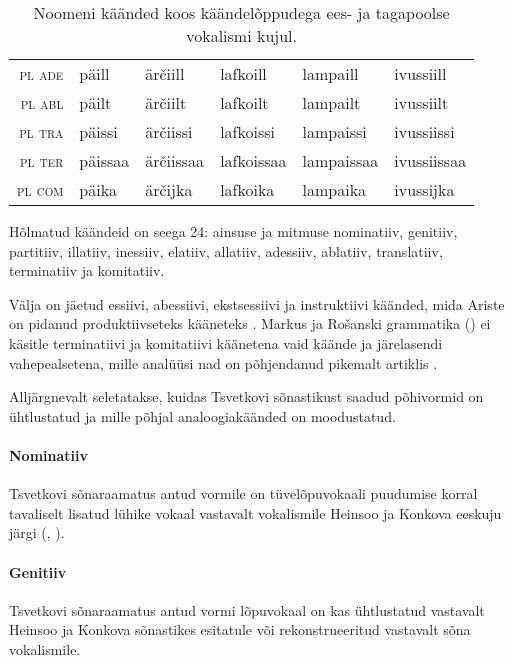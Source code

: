 \documentclass[12pt,a4paper]{article}
\newcommand{\msd}[1]{\textsc{#1}}
\begin{document}
\begin{table}[ht]
\begin{tabular}[t]{r l l l l l}
    \msd{pl ade} & päill & ärčiill & lafkoill & lampaill & ivussiill \\
    \msd{pl abl} & päilt & ärčiilt & lafkoilt & lampailt & ivussiilt \\
    \msd{pl tra} & päissi & ärčiissi & lafkoissi & lampaissi & ivussiissi \\
    \msd{pl ter} & päissaa & ärčiissaa & lafkoissaa & lampaissaa &  ivussiissaa \\
    \msd{pl com} & päika & ärčijka & lafkoika & lampaika & ivussijka \\
  \end{tabular}
  \caption{Noomeni käänded koos käändelõppudega ees- ja tagapoolse vokalismi kujul.}
  \label{tab:noomeni-käänded}
\end{table}

Hõlmatud käändeid on seega 24: ainsuse ja mitmuse nominatiiv, genitiiv, partitiiv, illatiiv, inessiiv, elatiiv, allatiiv, adessiiv, ablatiiv, translatiiv, terminatiiv ja komitatiiv.

Välja on jäetud essiivi, abessiivi, ekstsessiivi ja instruktiivi käänded, mida Ariste on pidanud produktiivseteks kääneteks \cite[17]{ariste_grammar_1968}. Markus ja Rošanski grammatika (\citeyear{__2011}) ei käsitle terminatiivi ja komitatiivi käänetena vaid käände ja järelasendi vahe\-pealsetena, mille analüüsi nad on põhjendanud pikemalt artiklis \cite{markus_comitative_2014}.

Alljärgnevalt seletatakse, kuidas Tsvetkovi sõnastikust saadud põhi\-vormid on ühtlustatud ja mille põhjal analoogia\-käänded on moodustatud.



\paragraph*{Nominatiiv}
Tsvetkovi sõnaraamatus antud vormile on tüve\-lõpu\-vokaali puudumise korral tavaliselt lisatud lühike vokaal vastavalt vokalismile Heinsoo ja Konkova eeskuju järgi (\cite[88]{heinsoo_vadsonakopittoja_2015}, \cite[10]{konkova_vaddceeli_2014}).


\paragraph*{Genitiiv}
Tsvetkovi sõnaraamatus antud vormi lõpuvokaal on kas ühtlustatud vastavalt Heinsoo ja Konkova sõnastikes esitatule või rekonstrueeritud vastavalt sõna vokalismile.
\end{document}
